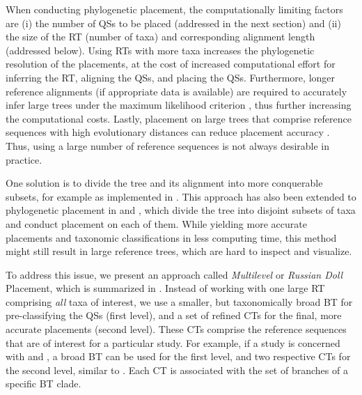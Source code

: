 When conducting phylogenetic placement, the computationally limiting factors are
(i) the number of \acp{QS} to be placed (addressed in the next section) and
(ii) the size of the \ac{RT} (number of taxa) and corresponding alignment length (addressed below).
Using \acp{RT} with more taxa increases the phylogenetic resolution of the placements,
at the cost of increased computational effort for inferring the \ac{RT}, aligning the \acp{QS}, and placing the \acp{QS}.
Furthermore, longer reference alignments (if appropriate data is available)
are required to accurately infer large trees under the maximum likelihood criterion \citep{Yang1994},
thus further increasing the computational costs.
Lastly, placement on large trees that comprise reference sequences with high evolutionary distances
can reduce placement accuracy \citep{Mirarab2012}.
Thus, using a large number of reference sequences is not always desirable in practice.

One solution is to divide the tree and its alignment into more conquerable subsets, %
for example as implemented in  \citep{Liu2009,Liu2012}.
This approach has also been extended to phylogenetic placement
in  \citep{Mirarab2012} and  \citep{Nguyen2014},
which divide the tree into disjoint subsets of taxa and conduct placement on each of them.
While yielding more accurate placements and taxonomic classifications in less computing time,
this method might still result in large reference trees, which are hard to inspect and visualize.

To address this issue, we present an approach called \emph{Multilevel} or \emph{Russian Doll} Placement,
which is summarized in .
Instead of working with one large \ac{RT} comprising {\em all} taxa of interest,
we use a smaller, but taxonomically broad \ac{BT} for pre-classifying the \acp{QS} (first level),
and a set of refined \acp{CT} for the final, more accurate placements (second level).
These \acp{CT} comprise the reference sequences that are of interest for a particular study.
For example, if a study is concerned with  and ,
a broad  \ac{BT} can be used for the first level,
and two respective \acp{CT} for the second level, similar to \citep{Mahe2017}.
Each \ac{CT} is associated with the set of branches of a specific \ac{BT} clade.

